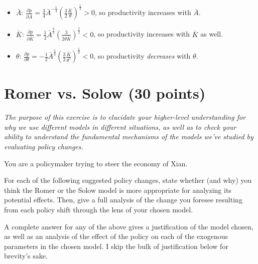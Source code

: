 \documentclass{article}
\newenvironment{solution}{\color{red}}{\color{black}}
\begin{document}
\begin{enumerate}
\begin{solution}
\begin{itemize}
\item $\bar{A}$: $\frac{\partial p}{\partial \bar{A}} = \frac34 \bar{A}^{-\frac14} \left(\frac32 \frac{\bar{K}}{\theta} \right)^\frac12 > 0$, so productivity increases with $\bar{A}$.
\item $\bar{K}$: $\frac{\partial p}{\partial \bar{K}} = \frac12 \bar{A}^\frac34 \left(\frac3{2\theta \bar{K}} \right)^\frac12 < 0$, so productivity increases with $\bar{K}$ as well.
\item $\theta$: $\frac{\partial p}{\partial \theta} = -\frac12 \bar{A}^\frac34 \left(\frac32 \frac{\bar{K}}{\theta^3} \right)^\frac12 < 0$, so productivity \emph{decreases} with $\theta$.
\end{itemize}
\end{solution}
\end{enumerate}

\section*{Romer vs. Solow (30 points)}

\small{\textit{The purpose of this exercise is to elucidate your higher-level understanding for why we use different models in different situations, as well as to check your ability to understand the fundamental mechanisms of the models we've studied by evaluating policy changes.}}

You are a policymaker trying to steer the economy of Xian.

For each of the following suggested policy changes, state whether (and why) you think the Romer or the Solow model is more appropriate for analyzing its potential effects. Then, give a full analysis of the change you foresee resulting from each policy shift through the lens of your chosen model.

\begin{solution}
A complete answer for any of the above gives a justification of the model chosen, as well as an analysis of the effect of the policy on each of the exogenous parameters in the chosen model. I skip the bulk of justification below for brevity's sake.
\end{solution}
\end{document}
